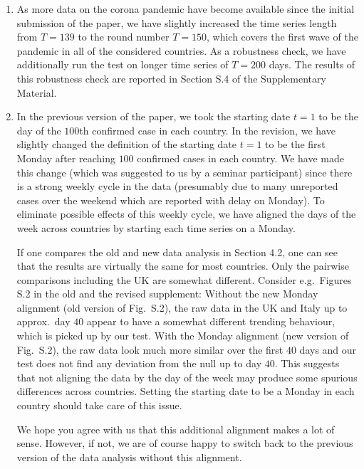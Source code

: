 \documentclass[a4paper,12pt]{article}
\begin{document}
\begin{enumerate}[label=(\roman*), leftmargin=0.8cm]

\item As more data on the corona pandemic have become available since the initial submission of the paper, we have slightly increased the time series length from $T=139$ to the round number $T=150$, which covers the first wave of the pandemic in all of the considered countries. As a robustness check, we have additionally run the test on longer time series of $T=200$ days. The results of this robustness check are reported in Section S.4 of the Supplementary Material. 

\item In the previous version of the paper, we took the starting date $t=1$ to be the day of the $100$th confirmed case in each country. In the revision, we have slightly changed the definition of the starting date $t=1$ to be the first Monday after reaching $100$ confirmed cases in each country. We have made this change (which was suggested to us by a seminar participant) since there is a strong weekly cycle in the data (presumably due to many unreported cases over the weekend which are reported with delay on Monday). To eliminate possible effects of this weekly cycle, we have aligned the days of the week across countries by starting each time series on a Monday. 

If one compares the old and new data analysis in Section 4.2, one can see that the results are virtually the same for most countries. Only the pairwise comparisons including the UK are somewhat different. Consider e.g.\ Figures S.2 in the old and the revised supplement: Without the new Monday alignment (old version of Fig.\ S.2), the raw data in the UK and Italy up to approx.\ day $40$ appear to have a somewhat different trending behaviour, which is picked up by our test. With the Monday alignment (new version of Fig.\ S.2), the raw data look much more similar over the first $40$ days and our test does not find any deviation from the null up to day $40$. This suggests that not aligning the data by the day of the week may produce some spurious differences across countries. Setting the starting date to be a Monday in each country should take care of this issue. 

We hope you agree with us that this additional alignment makes a lot of sense. However, if not, we are of course happy to switch back to the previous version of the data analysis without this alignment. 

\end{enumerate}
\end{document}
